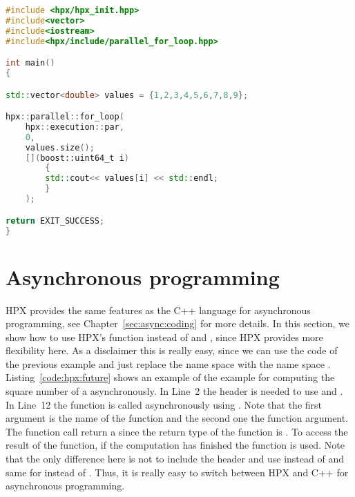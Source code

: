 \begin{lstlisting}[language=c++,caption={Parallel range-based for loops using HPX.\label{code:hpx:parallel:range:loop}},float,floatplacement=tb]
#include <hpx/hpx_init.hpp>
#include<vector>
#include<iostream>
#include<hpx/include/parallel_for_loop.hpp>

int main()
{

std::vector<double> values = {1,2,3,4,5,6,7,8,9};

hpx::parallel::for_loop(
	hpx::execution::par, 
	0, 
	values.size();
	[](boost::uint64_t i)
		{
		std::cout<< values[i] << std::endl;
		}
	);

return EXIT_SUCCESS;
}

\end{lstlisting}

\section{Asynchronous programming}
\label{sec:hpx:async}
HPX provides the same features as the C++ language for asynchronous programming, see Chapter~\ref{sec:async:coding} for more details. In this section, we show how to use HPX's function instead of  and , since HPX provides more flexibility here. As a disclaimer this is really easy, since we can use the code of the previous example and just replace the name space  with the name space . Listing~\ref{code:hpx:future} shows an example of the example for computing the square number of a asynchronously. In Line~2 the header  is needed to use  and . In Line~12 the function  is called asynchronously using . Note that the first argument is the name of the function and the second one the function argument. The function call return a  since the return type of the function is . To access the result of the function, if the computation has finished the function  is used. Note that the only difference here is not to include the header  and use  instead of  and same for  instead of . Thus, it is really easy to switch between HPX and C++ for asynchronous programming.

